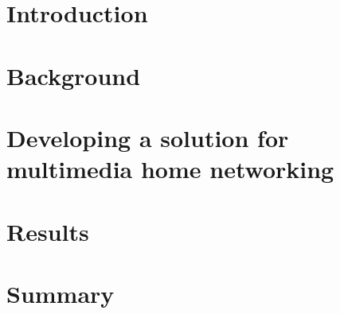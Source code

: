 \documentclass[english,12pt,a4paper,pdftex]{article}
\begin{document}
\section{Introduction}

\thispagestyle{empty}

 

\clearpage

\vspace*{100px}
 \section{Background\label{chapter2}}
 


\clearpage
\vspace*{100px}
\section{Developing a solution for multimedia home networking\label{chapter3}}



\clearpage
\vspace*{100px}
\section{Results\label{chapter4}}



\clearpage
\vspace*{100px}
\section{Summary\label{chapter5}}



\clearpage


\end{document}
